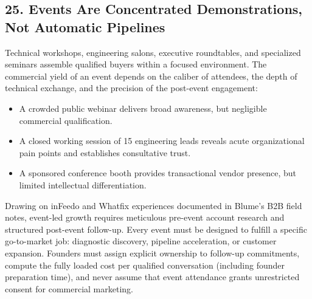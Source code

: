 \subsection*{25. Events Are Concentrated Demonstrations, Not Automatic Pipelines}

Technical workshops, engineering salons, executive roundtables, and specialized seminars assemble qualified buyers within a focused environment. The commercial yield of an event depends on the caliber of attendees, the depth of technical exchange, and the precision of the post-event engagement:
\begin{itemize}[leftmargin=*,itemsep=1pt]
  \item A crowded public webinar delivers broad awareness, but negligible commercial qualification.
  \item A closed working session of 15 engineering leads reveals acute organizational pain points and establishes consultative trust.
  \item A sponsored conference booth provides transactional vendor presence, but limited intellectual differentiation.
\end{itemize}

Drawing on inFeedo and Whatfix experiences documented in Blume's B2B field notes, event-led growth requires meticulous pre-event account research and structured post-event follow-up. Every event must be designed to fulfill a specific go-to-market job: diagnostic discovery, pipeline acceleration, or customer expansion. Founders must assign explicit ownership to follow-up commitments, compute the fully loaded cost per qualified conversation (including founder preparation time), and never assume that event attendance grants unrestricted consent for commercial marketing.

